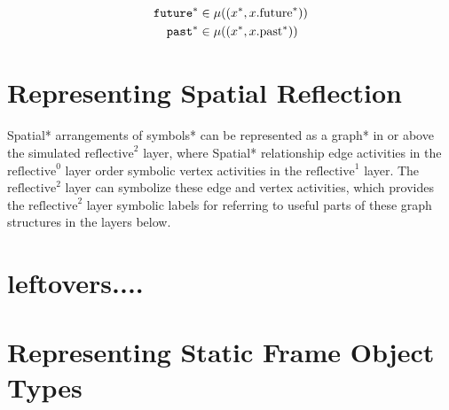 \begin{align}
\text{\tt{future}}^* &\in \mu((x^*, x.\text{future}^*)) \\
  \text{\tt{past}}^* &\in \mu((x^*, x.\text{past}^*)) 
\end{align}



\section{Representing Spatial Reflection}

Spatial* arrangements of symbols* can be represented as a graph* in or
above the simulated $\text{reflective}^2$ layer, where Spatial*
relationship edge activities in the $\text{reflective}^0$ layer order
symbolic vertex activities in the $\text{reflective}^1$ layer.  The
$\text{reflective}^2$ layer can symbolize these edge and vertex
activities, which provides the $\text{reflective}^2$ layer symbolic
labels for referring to useful parts of these graph structures in the
layers below.

 \noindent










\section{leftovers....}

\section{Representing Static Frame Object Types}

